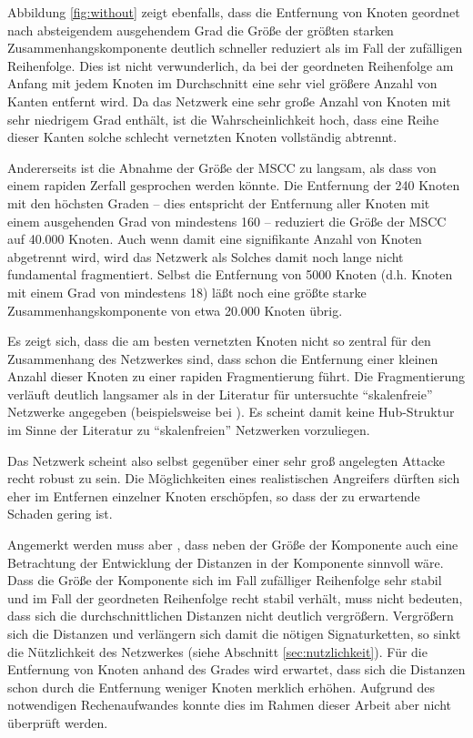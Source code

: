 Abbildung \ref{fig:without} zeigt ebenfalls, dass die Entfernung von
Knoten geordnet nach absteigendem ausgehendem Grad die Gr\"o{\ss}e der
gr\"o{\ss}ten starken Zusammenhangskomponente deutlich schneller reduziert als im
Fall der zuf\"alligen Reihenfolge. Dies ist nicht verwunderlich, da
bei der geordneten Reihenfolge am Anfang mit jedem Knoten im
Durchschnitt eine sehr viel gr\"o{\ss}ere Anzahl von Kanten
entfernt wird. Da das Netzwerk eine sehr gro{\ss}e Anzahl von Knoten mit
sehr niedrigem Grad enth\"alt, ist die Wahrscheinlichkeit hoch, dass
eine Reihe dieser Kanten solche schlecht vernetzten Knoten
vollst\"andig abtrennt.

Andererseits ist die Abnahme der Gr\"o{\ss}e der MSCC zu langsam, als
dass von einem rapiden Zerfall gesprochen werden k\"onnte. Die
Entfernung der 240 Knoten mit den h\"ochsten Graden -- dies entspricht
der Entfernung aller Knoten mit einem ausgehenden Grad von mindestens
160 -- reduziert die
Gr\"o{\ss}e der MSCC auf 40.000 Knoten. Auch wenn damit eine
signifikante Anzahl von Knoten abgetrennt wird, wird das Netzwerk als
Solches damit noch lange nicht fundamental fragmentiert. Selbst die
Entfernung von 5000 Knoten (d.h. Knoten mit einem Grad von mindestens
18) l\"a{\ss}t noch eine gr\"o{\ss}te starke Zusammenhangskomponente von
etwa 20.000 Knoten \"ubrig.

Es zeigt sich, dass die am besten vernetzten Knoten nicht so zentral
f\"ur den Zusammenhang des Netzwerkes sind, dass schon die Entfernung
einer kleinen Anzahl dieser Knoten zu einer rapiden Fragmentierung
f\"uhrt. Die Fragmentierung verl\"auft deutlich langsamer als in der
Literatur f\"ur untersuchte ``skalenfreie'' Netzwerke angegeben
(beispielsweise bei \cite{Albert2000}). Es scheint damit keine
Hub-Struktur im Sinne der Literatur zu ``skalenfreien'' Netzwerken
vorzuliegen. 

Das Netzwerk scheint also selbst gegen\"uber einer sehr gro{\ss}
angelegten Attacke recht robust zu sein. Die Möglichkeiten eines realistischen Angreifers dürften
sich eher im Entfernen einzelner Knoten erschöpfen, so dass der zu
erwartende Schaden gering ist. 

Angemerkt werden muss aber , dass neben der Größe der Komponente auch
eine Betrachtung der Entwicklung der Distanzen in der Komponente
sinnvoll wäre. Dass die Größe der Komponente sich im Fall
zufälliger Reihenfolge sehr stabil und im Fall der geordneten
Reihenfolge recht stabil verhält, muss nicht bedeuten, dass
sich die durchschnittlichen Distanzen nicht deutlich
vergrößern. Vergrößern sich die Distanzen und verlängern sich
damit die nötigen Signaturketten, so sinkt die Nützlichkeit des
Netzwerkes (siehe Abschnitt \ref{sec:nutzlichkeit}). Für die
Entfernung von Knoten anhand des Grades wird
erwartet, dass sich die
Distanzen schon durch die Entfernung weniger Knoten merklich
erhöhen. Aufgrund des notwendigen Rechenaufwandes konnte dies im
Rahmen dieser Arbeit aber nicht \"uberpr\"uft werden.


